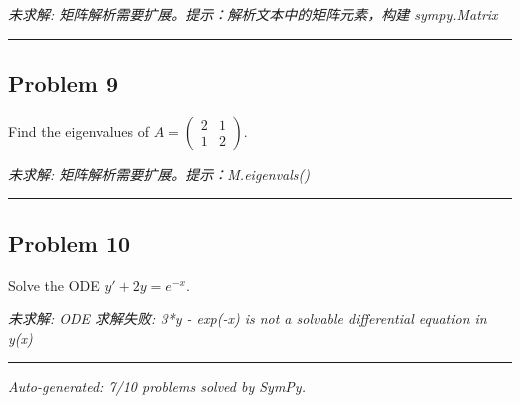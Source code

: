 \documentclass[12pt, a4paper]{article}
\newcommand{\problem}[1]{\subsection*{Problem #1}}
\begin{document}
\textit{\color{red} 未求解: 矩阵解析需要扩展。提示：解析文本中的矩阵元素，构建 sympy.Matrix}

\vspace{1em}
\hrule
\vspace{1em}

\problem{9}

Find the eigenvalues of $A = \begin{pmatrix} 2 & 1 \\ 1 & 2 \end{pmatrix}$.

\textit{\color{red} 未求解: 矩阵解析需要扩展。提示：M.eigenvals()}

\vspace{1em}
\hrule
\vspace{1em}

\problem{10}

Solve the ODE $y' + 2y = e^{-x}$.

\textit{\color{red} 未求解: ODE 求解失败: 3*y - exp(-x) is not a solvable differential equation in y(x)}

\vspace{1em}
\hrule
\vspace{1em}


\vspace{2em}
\noindent\textit{Auto-generated: 7/10 problems solved by SymPy.}
\end{document}
